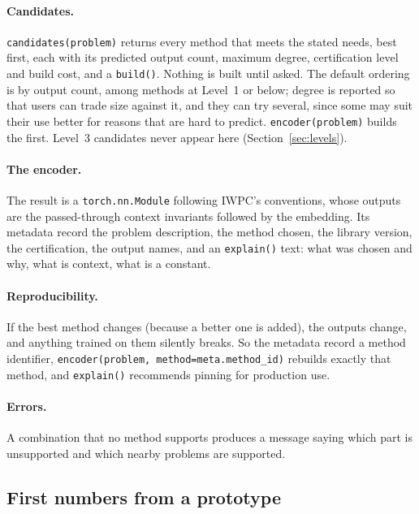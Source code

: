 \documentclass[11pt]{article}
\theoremstyle{definition}
\theoremstyle{remark}
\begin{document}
\paragraph{Candidates.} \texttt{candidates(problem)} returns every method that
meets the stated needs, best first, each with its predicted output count,
maximum degree, certification level and build cost, and a \texttt{build()}.
Nothing is built until asked. The default ordering is by output count, among
methods at Level~1 or below; degree is reported so that users can trade size
against it, and they can try several, since some may suit their use better for
reasons that are hard to predict. \texttt{encoder(problem)} builds the first.
Level~3 candidates never appear here (Section~\ref{sec:levels}).

\paragraph{The encoder.} The result is a \texttt{torch.nn.Module} following
IWPC's conventions, whose outputs are the passed-through context invariants
followed by the embedding. Its metadata record the problem description, the
method chosen, the library version, the certification, the output names, and
an \texttt{explain()} text: what was chosen and why, what is context, what
is a constant.

\paragraph{Reproducibility.} If the best method changes (because a better one
is added), the outputs change, and anything trained on them silently breaks.
So the metadata record a method identifier, \texttt{encoder(problem,
method=meta.method\_id)} rebuilds exactly that method, and \texttt{explain()}
recommends pinning for production use.

\paragraph{Errors.} A combination that no method supports produces a message
saying which part is unsupported and which nearby problems are supported.

\subsection{First numbers from a prototype}
\end{document}
